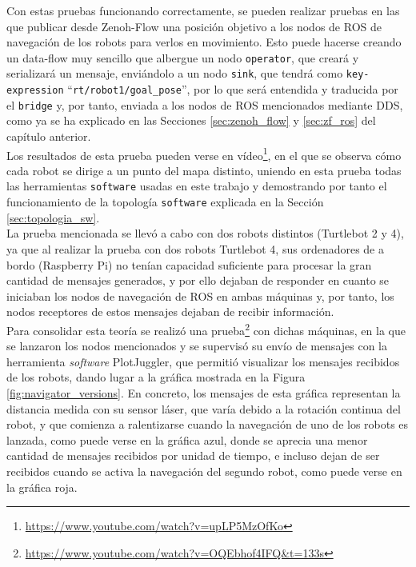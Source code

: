 Con estas pruebas funcionando correctamente, se pueden realizar pruebas en las
que publicar desde Zenoh-Flow una posición objetivo a los nodos de ROS de
navegación de los robots para verlos en movimiento.
Esto puede hacerse creando un data-flow muy sencillo que albergue un nodo
\texttt{operator}, que creará y serializará un mensaje, enviándolo a un nodo
\texttt{sink}, que tendrá como \texttt{key-expression}
``\texttt{rt/robot1/goal\_pose}'', por lo que será entendida y traducida por el
\texttt{bridge} y, por tanto, enviada a los nodos de ROS mencionados mediante
DDS, como ya se ha explicado en las Secciones \ref{sec:zenoh_flow} y
\ref{sec:zf_ros} del capítulo anterior.
\\

Los resultados de esta prueba pueden verse en vídeo\footnote{
\url{https://www.youtube.com/watch?v=upLP5MzOfKo}}, en el que se observa cómo
cada robot se dirige a un punto del mapa distinto, uniendo en esta prueba todas
las herramientas \texttt{software} usadas en este trabajo y demostrando por
tanto el funcionamiento de la topología \texttt{software} explicada en la
Sección \ref{sec:topologia_sw}.
\\

La prueba mencionada se llevó a cabo con dos robots distintos (Turtlebot 2 y 4),
ya que al realizar la prueba con dos robots Turtlebot 4, sus ordenadores de a
bordo (Raspberry Pi) no tenían capacidad suficiente para procesar la gran
cantidad de mensajes generados, y por ello dejaban de responder en cuanto se
iniciaban los nodos de navegación de ROS en ambas máquinas y, por tanto, los
nodos receptores de estos mensajes dejaban de recibir información.
\\

Para consolidar esta teoría se realizó una prueba\footnote{
\url{https://www.youtube.com/watch?v=OQEbhof4IFQ&t=133s}} con dichas máquinas,
en la que se lanzaron los nodos mencionados y se supervisó su envío de mensajes
con la herramienta \textit{software} PlotJuggler, que permitió visualizar los
mensajes recibidos de los robots, dando lugar a la gráfica mostrada en la Figura
\ref{fig:navigator_versions}.
En concreto, los mensajes de esta gráfica representan la distancia medida con su
sensor láser, que varía debido a la rotación continua del robot, y que comienza
a ralentizarse cuando la navegación de uno de los robots es lanzada, como puede
verse en la gráfica azul, donde se aprecia una menor cantidad de mensajes
recibidos por unidad de tiempo, e incluso dejan de ser recibidos cuando se
activa la navegación del segundo robot, como puede verse en la gráfica roja.
\\

